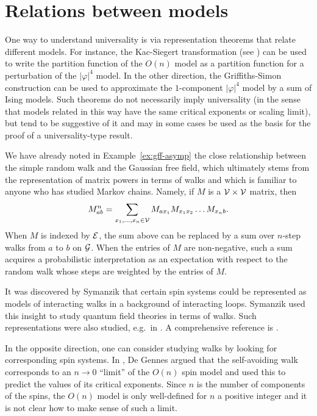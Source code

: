 \section{Relations between models}
\label{sec:spin-walk}

One way to understand universality is via representation theorems that relate
different models. For instance, the Kac-Siegert transformation (see \cite{Bryd09})
can be used to write the partition function of the $O(n)$ model as a partition function
for a perturbation of the $|\varphi|^4$ model. In the other direction, the
Griffiths-Simon construction \cite{SG73} can be used to approximate the $1$-component
$|\varphi|^4$ model by a sum of Ising models. Such theorems do not necessarily
imply universality
(in the sense that models related in this way have the same critical exponents or
scaling limit), but tend to be suggestive of it and may in some cases
be used as the basis for the proof of a universality-type result.

We have already noted in Example~\ref{ex:gff-asymp} the close relationship between
the simple random walk
and the Gaussian free field, which ultimately stems from the representation of
matrix powers in terms of walks and which is familiar to anyone
who has studied Markov chains. Namely, if $M$ is a $\mathcal{V}\times\mathcal{V}$
matrix, then
\begin{equation}
M^n_{ab} = \sum_{x_1,\ldots,x_n\in\mathcal{V}} M_{ax_1} M_{x_1x_2} \ldots M_{x_nb}.
\end{equation}
When $M$ is indexed by $\mathcal{E}$, the
sum above can be replaced by a sum over $n$-step walks from $a$ to $b$ on $\mathcal{G}$.
When the entries of $M$ are non-negative, such a sum acquires a probabilistic
interpretation as an expectation with respect to the random walk whose steps
are weighted by the entries of $M$.

It was discovered by Symanzik \cite{Syma69} that certain spin systems could be
represented as models of interacting walks in a background of interacting loops.
Symanzik used this insight to study quantum field theories in terms of walks.
Such representations were also studied, e.g.\ in \cite{BFS82,Dynk83}. A comprehensive
reference is \cite{FFS92}.

In the opposite direction, one can consider studying walks by looking for corresponding
spin systems. In \cite{Genn72}, De Gennes argued that the self-avoiding walk
corresponds to an $n \to 0$ ``limit'' of the $O(n)$ spin model and used this
to predict the values of its critical exponents. Since $n$ is
the number of components of the spins, the $O(n)$ model is only well-defined
for $n$ a positive integer and it is not clear how to make sense of such a limit.

